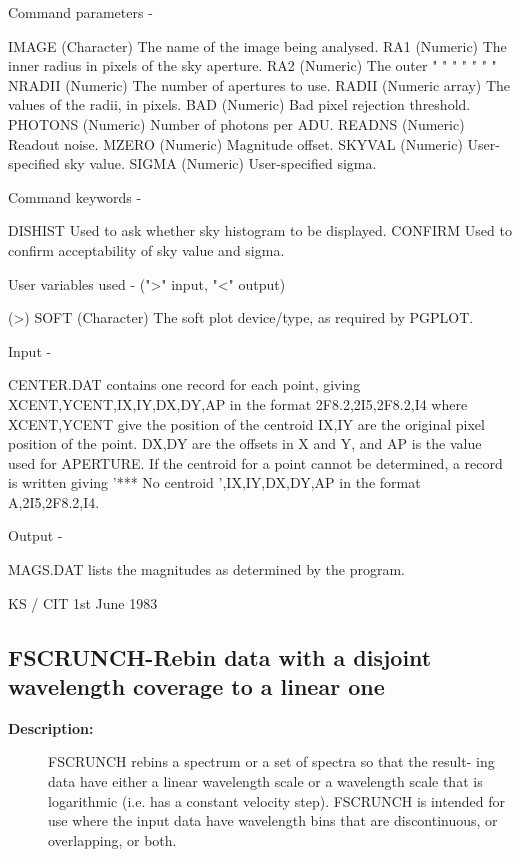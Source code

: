 \begin{description}
\begin{description}
\begin{terminalv}
 Command parameters -

 IMAGE   (Character) The name of the image being analysed.
 RA1     (Numeric) The inner radius in pixels of the sky aperture.
 RA2     (Numeric) The outer   "     "   "    "    "   "    "
 NRADII  (Numeric) The number of apertures to use.
 RADII   (Numeric array) The values of the radii, in pixels.
 BAD     (Numeric) Bad pixel rejection threshold.
 PHOTONS (Numeric) Number of photons per ADU.
 READNS  (Numeric) Readout noise.
 MZERO   (Numeric) Magnitude offset.
 SKYVAL  (Numeric) User-specified sky value.
 SIGMA   (Numeric) User-specified sigma.

 Command keywords -

 DISHIST  Used to ask whether sky histogram to be displayed.
 CONFIRM  Used to confirm acceptability of sky value and sigma.

 User variables used -  (">" input, "<" output)

 (>) SOFT  (Character) The soft plot device/type, as required by
           PGPLOT.

 Input -

 CENTER.DAT contains one record for each point, giving
            XCENT,YCENT,IX,IY,DX,DY,AP
            in the format 2F8.2,2I5,2F8.2,I4 where
            XCENT,YCENT give the position of the centroid
            IX,IY are the original pixel position of the point.
            DX,DY are the offsets in X and Y, and
            AP is the value used for APERTURE.
            If the centroid for a point cannot be determined, a
            record is written giving
            '*** No centroid ',IX,IY,DX,DY,AP
            in the format A,2I5,2F8.2,I4.

 Output -

 MAGS.DAT   lists the magnitudes as determined by the program.

                                       KS / CIT 1st June 1983
\end{terminalv}
\end{description}
\subsection{FSCRUNCH-\label{FSCRUNCH}Rebin data with a disjoint wavelength coverage to a linear one}
\begin{description}

\item [\textbf{Description:}]
 FSCRUNCH rebins a spectrum or a set of spectra so that the result-
 ing data have either a linear wavelength scale or a wavelength
 scale that is logarithmic (i.e. has a constant velocity step).
 FSCRUNCH is intended for use where the input data have wavelength
 bins that are discontinuous, or overlapping, or both.


\end{description}
\end{description}
